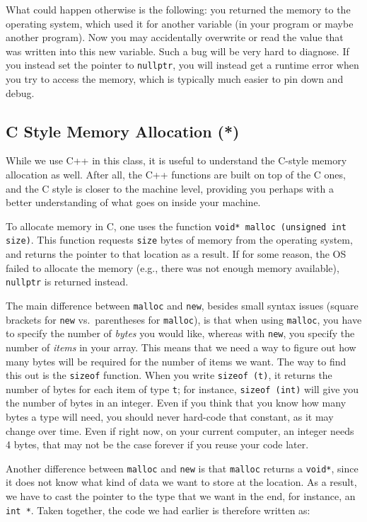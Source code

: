 What could happen otherwise is the following:
you returned the memory to the operating system, which used it for
another variable (in your program or maybe another program).
Now you may accidentally overwrite or read the value that was written
into this new variable. Such a bug will be very hard to diagnose.
If you instead set the pointer to \texttt{nullptr}, you will instead get
a runtime error when you try to access the memory,
which is typically much easier to pin down and debug.

\subsection{C Style Memory Allocation (*)} \label{sec:dynamic-memory:malloc-free}
While we use C++ in this class, it is useful to understand the C-style
memory allocation as well.
After all, the C++ functions are built on top of the C ones,
and the C style is closer to the machine level, providing you perhaps
with a better understanding of what goes on inside your machine.

To allocate memory in C, one uses the function
\texttt{void* malloc (unsigned int size)}.
This function requests \texttt{size} bytes of memory from the operating
system, and returns the pointer to that location as a result. 
If for some reason, the OS failed to allocate the memory
(e.g., there was not enough memory available),
\texttt{nullptr} is returned instead.

The main difference between \texttt{malloc} and \texttt{new},
besides small syntax issues (square brackets for \texttt{new}
vs.~parentheses for \texttt{malloc}), is that when using \texttt{malloc},
you have to specify the number of \emph{bytes} you would like,
whereas with \texttt{new}, you specify the number of \emph{items} in
your array. 
This means that we need a way to figure out how many bytes will be
required for the number of items we want.
The way to find this out is the \texttt{sizeof} function.
When you write \texttt{sizeof (t)}, it returns the number of bytes for
each item of type \texttt{t};
for instance, \texttt{sizeof (int)} will give you the number of bytes in
an integer.
Even if you think that you know how many bytes a type will need,
you should never hard-code that constant, as it may change over time.
Even if right now, on your current computer, an integer needs 4 bytes,
that may not be the case forever if you reuse your code later.

Another difference between \texttt{malloc} and \texttt{new} is that
\texttt{malloc} returns a \texttt{void*},
since it does not know what kind of data we want to store at the
location.
As a result, we have to cast the pointer to the type that we want in
the end, for instance, an \texttt{int *}.
Taken together, the code we had earlier is therefore written as:

